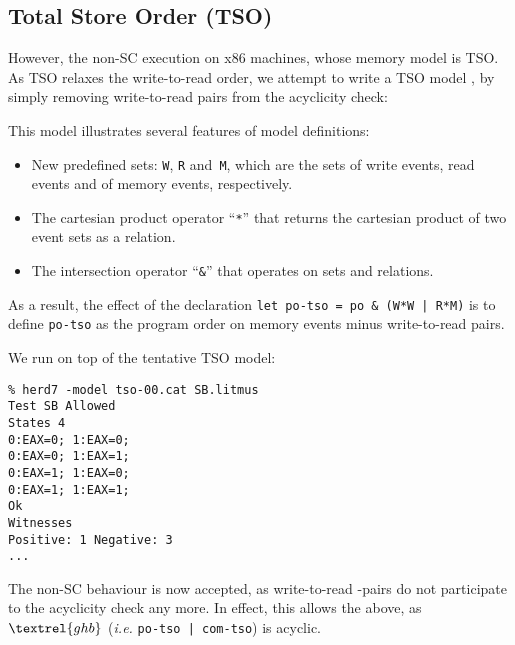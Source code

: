 \subsection{Total Store Order (TSO)}
However, the non-SC execution  on x86 machines,
whose memory model is TSO. As TSO relaxes the write-to-read order, we attempt
to write a TSO model , by simply removing write-to-read
pairs from the acyclicity check:

This model illustrates several features
of model definitions:
\begin{itemize}
\item New predefined sets: \verb+W+, \verb+R+ and~\verb+M+, which are
the sets of write events, read events and of memory events, respectively.
\item The cartesian product operator ``\verb+*+'' that returns the cartesian
product of two event sets as a relation.
\item The intersection operator ``\verb+&+'' that operates on sets and
relations.
\end{itemize}
As a result, the effect of the declaration
\verb+let po-tso = po & (W*W | R*M)+ is to define \verb+po-tso+
as the program order on memory events minus write-to-read pairs.

We run  on top of the tentative TSO model:
\begin{verbatim}
% herd7 -model tso-00.cat SB.litmus
Test SB Allowed
States 4
0:EAX=0; 1:EAX=0;
0:EAX=0; 1:EAX=1;
0:EAX=1; 1:EAX=0;
0:EAX=1; 1:EAX=1;
Ok
Witnesses
Positive: 1 Negative: 3
...
\end{verbatim}
\label{sb:image}The non-SC behaviour is now accepted, as write-to-read -pairs
do not participate to the acyclicity check any more. In effect, this allows
the  above,
as $\textrel{ghb}$ (\emph{i.e.}
\verb+po-tso | com-tso+) is acyclic.
\begin{center}\end{center}


